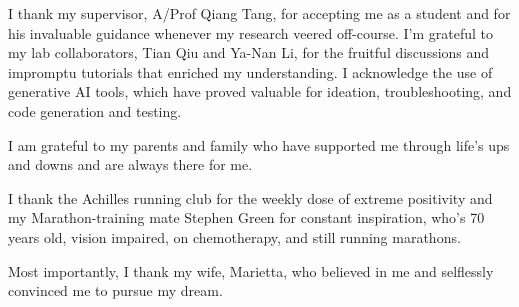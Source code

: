 I thank my supervisor, A/Prof Qiang Tang, for accepting me as a student and for his invaluable guidance whenever my research veered off-course. I'm grateful to my lab collaborators, Tian Qiu and Ya-Nan Li, for the fruitful discussions and impromptu tutorials that enriched my understanding. I acknowledge the use of generative AI tools, which have proved valuable for ideation, troubleshooting, and code generation and testing.

I am grateful to my parents and family who have supported me through life's ups and downs and are always there for me. 

I thank the Achilles running club for the weekly dose of extreme positivity and my Marathon-training mate Stephen Green for constant inspiration, who's 70 years old, vision impaired, on chemotherapy, and still running marathons.

Most importantly, I thank my wife, Marietta, who believed in me and selflessly convinced me to pursue my dream.